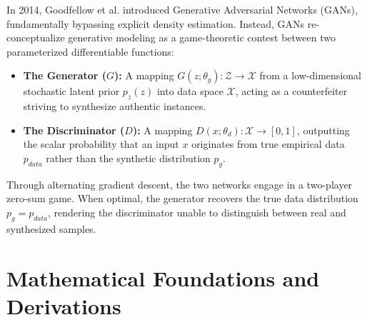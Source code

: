 \documentclass[conference]{IEEEtran}
\begin{document}
In 2014, Goodfellow et al. \cite{goodfellow2014generative} introduced Generative Adversarial Networks (GANs), fundamentally bypassing explicit density estimation. Instead, GANs re-conceptualize generative modeling as a game-theoretic contest between two parameterized differentiable functions:
\begin{itemize}
    \item \textbf{The Generator ($G$):} A mapping $G(z; \theta_g): \mathcal{Z} \to \mathcal{X}$ from a low-dimensional stochastic latent prior $p_z(z)$ into data space $\mathcal{X}$, acting as a counterfeiter striving to synthesize authentic instances.
    \item \textbf{The Discriminator ($D$):} A mapping $D(x; \theta_d): \mathcal{X} \to [0, 1]$, outputting the scalar probability that an input $x$ originates from true empirical data $p_{data}$ rather than the synthetic distribution $p_g$.
\end{itemize}

Through alternating gradient descent, the two networks engage in a two-player zero-sum game. When optimal, the generator recovers the true data distribution $p_g = p_{data}$, rendering the discriminator unable to distinguish between real and synthesized samples.

\section{Mathematical Foundations and Derivations}
\end{document}
